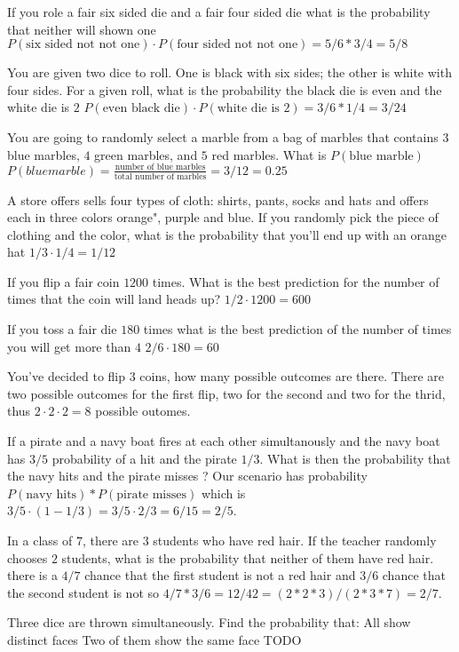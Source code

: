 \begin{ExerciseList}

\Exercise If you role a fair six sided die and a fair four sided die what is the probability that neither will shown one
\Answer $P(\text{six sided not not one}) \cdot P(\text{four sided not not one}) = 5/6 * 3/4 = 5/8$

\Exercise You are given two dice to roll. One is black with six sides; the other is white with four sides. For a given roll, what is the probability the black die is even and the white die is $2$
\Answer $P(\text{even black die}) \cdot P(\text{white die is 2}) = 3/6 * 1/4 = 3/24$

\Exercise You are going to randomly select a marble from a bag of marbles that contains $3$ blue marbles, $4$ green marbles, and $5$ red marbles. What is $P(\text{blue marble})$
\Answer $P(blue marble) = \frac{\text{number of blue marbles}}{\text{total number of marbles}} = 3/12 = 0.25$

\Exercise A store offers sells four types of cloth: shirts, pants, socks and hats and offers each in three colors orange", purple and blue. If you randomly pick the piece of clothing and the color, what is the probability that you'll end up with an orange hat
\Answer $1/3 \cdot 1/4 = 1/12$

\Exercise If you flip a fair coin $1200$ times. What is the best prediction for the number of times that the coin will land heads up?
\Answer $1/2 \cdot 1200 = 600$

\Exercise If you toss a fair die $180$ times what is the best prediction of the number of times you will get more than $4$
\Answer $2/6 \cdot 180 = 60$

\Exercise You've decided to flip $3$ coins, how many possible outcomes are there.
\Answer There are two possible outcomes for the first flip, two for the second and two for the thrid, thus $2 \cdot 2 \cdot 2 = 8$ possible outomes.

\Exercise If a pirate and a navy boat fires at each other simultanously and the navy boat has $3/5$ probability of a hit and the pirate $1/3$. What is then the probability that the navy hits and the pirate misses ?
\Answer Our scenario has probability $P(\text{navy hits}) * P(\text{pirate misses})$ which is $3/5 \cdot (1 - 1/3) = 3/5 \cdot 2/3 = 6/15 = 2/5$.

\Exercise In a class of $7$, there are $3$ students who have red hair. If the teacher randomly chooses $2$ students, what is the probability that neither of them have red hair.
\Answer there is a $4/7$ chance that the first student is not a red hair and $3/6$ chance that the second student is not so $4/7 * 3/6 = 12/42 = (2*2*3)/(2*3*7) = 2/7$.

\Exercise Three dice are thrown simultaneously. Find the probability that:
\Question All show distinct faces
\Question Two of them show the same face
\Answer TODO %

\end{ExerciseList}

